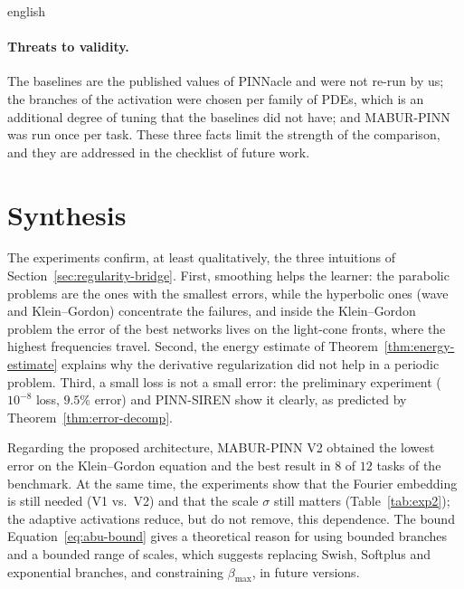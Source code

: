 \documentclass[0000.tex]{subfiles}
\begin{document}
\begin{hyphenrules}{english}
\paragraph{Threats to validity.}
The baselines are the published values of PINNacle and were not re-run by us; the branches of the
activation were chosen per family of PDEs, which is an additional degree of tuning that the baselines did
not have; and MABUR-PINN was run once per task. These three facts limit the strength of the comparison,
and they are addressed in the checklist of future work.

\section{Synthesis}\label{sec:exp-synthesis}

The experiments confirm, at least qualitatively, the three intuitions of Section~\ref{sec:regularity-bridge}.
First, smoothing helps the learner: the parabolic problems are the ones with the smallest errors, while the
hyperbolic ones (wave and Klein--Gordon) concentrate the failures, and inside the Klein--Gordon problem the
error of the best networks lives on the light-cone fronts, where the highest frequencies travel. Second, the
energy estimate of Theorem~\ref{thm:energy-estimate} explains why the derivative regularization did not help in a
periodic problem. Third, a small loss is not a small error: the preliminary experiment ($10^{-8}$ loss,
$9.5\%$ error) and PINN-SIREN show it clearly, as predicted by Theorem~\ref{thm:error-decomp}.

Regarding the proposed architecture, MABUR-PINN V2 obtained the lowest error on the Klein--Gordon equation and
the best result in $8$ of $12$ tasks of the benchmark. At the same time, the experiments show that the
Fourier embedding is still needed (V1 vs.\ V2) and that the scale $\sigma$ still matters
(Table~\ref{tab:exp2}); the adaptive activations reduce, but do not remove, this dependence. The bound
Equation~\eqref{eq:abu-bound} gives a theoretical reason for using bounded branches and a bounded range of scales,
which suggests replacing Swish, Softplus and exponential branches, and constraining $\beta_{\max}$, in
future versions.

\end{hyphenrules}

\ifSubfilesClassLoaded{}{}
\end{document}
